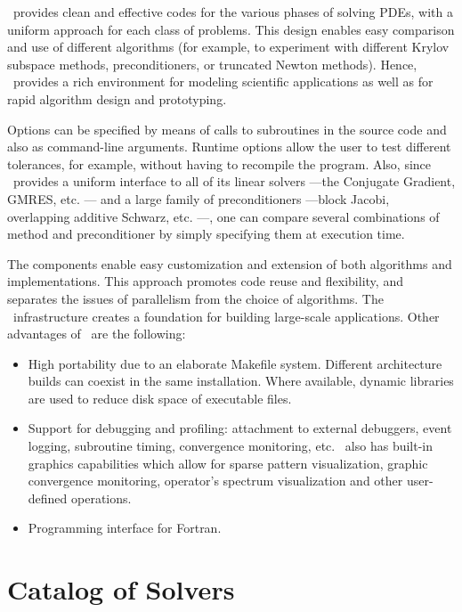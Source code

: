 	\petsc\ provides clean and effective codes for the various phases of solving PDEs, with a uniform approach for each class of problems.  This design enables easy comparison and use of different algorithms (for example, to experiment with different Krylov subspace methods, preconditioners, or truncated Newton methods). Hence, \petsc\ provides a rich environment for modeling scientific applications as well as for rapid algorithm design and prototyping.

	Options can be specified by means of calls to subroutines in the source code and also as command-line arguments. Runtime options allow the user to test different tolerances, for example, without having to recompile the program. Also, since \petsc\ provides a uniform interface to all of its linear solvers ---the Conjugate Gradient, GMRES, etc. --- and a large family of preconditioners ---block Jacobi, overlapping additive Schwarz, etc. ---, one can compare several combinations of method and preconditioner by simply specifying them at execution time.
	
	The components enable easy customization and extension of both algorithms and implementations.  This approach promotes code reuse and flexibility, and separates the issues of parallelism from the choice of algorithms.  The \petsc\ infrastructure creates a foundation for building large-scale applications.
	Other advantages of \petsc\ are the following:
	\begin{itemize}
	\item High portability due to an elaborate Makefile system. Different architecture builds can coexist in the same installation. Where available, dynamic libraries are used to reduce disk space of executable files.
	\item Support for debugging and profiling: attachment to external debuggers, event logging, subroutine timing, convergence monitoring, etc. \petsc\ also has built-in graphics capabilities which allow for sparse pattern visualization, graphic convergence monitoring, operator's spectrum visualization and other user-defined operations.
	\item Programming interface for Fortran.
	\end{itemize}

\chapter{Catalog of Solvers}
\label{cap:meth}

